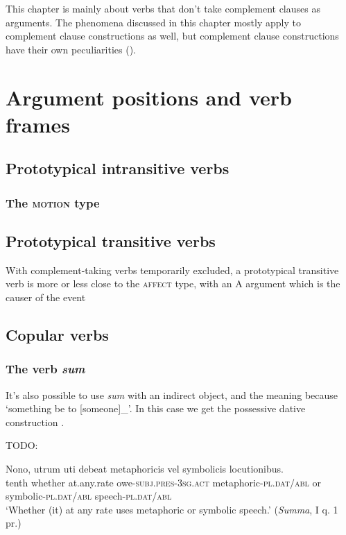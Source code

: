\documentclass[a4paper, oneside, 12pt]{report}
\newcommand*{\citesec}[1]{\S~{#1}}
\newcommand{\form}[1]{\emph{#1}}
\newcommand*{\category}[1]{\textsc{#1}}
\newcommand{\translate}[1]{`#1'}
\newcommand{\classify}[1]{{\textsc{#1}}}
\newcommand{\literature}[1]{\textit{#1}}
\begin{document}
This chapter is mainly about verbs that don't take complement clauses as arguments.
The phenomena discussed in this chapter mostly apply to complement clause constructions as well,
but complement clause constructions have their own peculiarities 
().


\section{Argument positions and verb frames}\label{sec:core-argument-marking}



\subsection{Prototypical intransitive verbs}\label{sec:prototypical-intransitive}

\subsubsection{The \classify{motion} type}


\subsection{Prototypical transitive verbs}\label{sec:prototypical-transitive}

With complement-taking verbs temporarily excluded,
a prototypical transitive verb is more or less close to the \classify{affect} type,
with an A argument which is the causer of the event 

\subsection{Copular verbs}

\subsubsection{The verb \form{sum}}\label{sec:sum}

It's also possible to use \form{sum} with an indirect object, 
and the meaning because \translate{something be to [someone]_{}}.
In this case we get the possessive dative construction
\citep[\citesec{373}]{allen1903allen}.

TODO: 

\begin{exe}
    \ex \gll Nono, utrum uti debeat metaphoricis vel symbolicis locutionibus. \\
    tenth whether at.any.rate owe-\category{subj}.\category{pres}-\category{3sg}.\category{act}  
    metaphoric-\category{pl.dat/abl} or symbolic-\category{pl.dat/abl} 
    speech-\category{pl.dat/abl} \\
    \glt \translate{Whether (it) at any rate uses metaphoric or symbolic speech.} (\literature{Summa}, I q. 1 pr.)
\end{exe}
\end{document}
